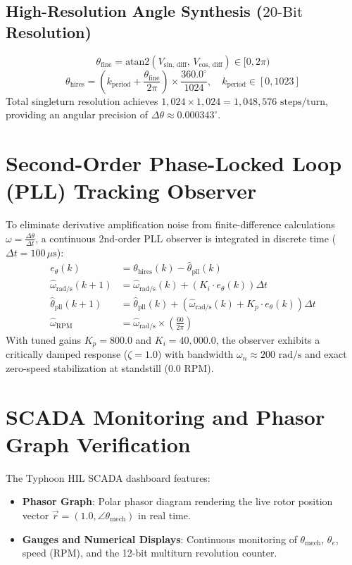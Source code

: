 \documentclass[11pt,a4paper]{article}
\begin{document}
\subsection{High-Resolution Angle Synthesis ($20\text{-Bit}$ Resolution)}
\begin{equation}
\theta_{\text{fine}} = \text{atan2}(V_{\text{sin, diff}},\, V_{\text{cos, diff}}) \in [0, 2\pi)
\end{equation}
\begin{equation}
\theta_{\text{hires}} = \left( k_{\text{period}} + \frac{\theta_{\text{fine}}}{2\pi} \right) \times \frac{360.0^\circ}{1024}, \quad k_{\text{period}} \in [0, 1023]
\end{equation}
Total singleturn resolution achieves $1,024 \times 1,024 = 1,048,576\text{ steps/turn}$, providing an angular precision of $\Delta\theta \approx 0.000343^\circ$.

\section{Second-Order Phase-Locked Loop (PLL) Tracking Observer}
To eliminate derivative amplification noise from finite-difference calculations $\omega = \frac{\Delta\theta}{\Delta t}$, a continuous 2nd-order PLL observer is integrated in discrete time ($\Delta t = 100\,\mu\text{s}$):
\begin{align}
e_{\theta}(k) &= \theta_{\text{hires}}(k) - \hat{\theta}_{\text{pll}}(k) \\
\hat{\omega}_{\text{rad/s}}(k+1) &= \hat{\omega}_{\text{rad/s}}(k) + \left( K_i \cdot e_{\theta}(k) \right) \Delta t \\
\hat{\theta}_{\text{pll}}(k+1) &= \hat{\theta}_{\text{pll}}(k) + \left( \hat{\omega}_{\text{rad/s}}(k) + K_p \cdot e_{\theta}(k) \right) \Delta t \\
\hat{\omega}_{\text{RPM}} &= \hat{\omega}_{\text{rad/s}} \times \left( \frac{60}{2\pi} \right)
\end{align}
With tuned gains $K_p = 800.0$ and $K_i = 40,000.0$, the observer exhibits a critically damped response ($\zeta = 1.0$) with bandwidth $\omega_n \approx 200\text{ rad/s}$ and exact zero-speed stabilization at standstill ($0.0\text{ RPM}$).

\section{SCADA Monitoring and Phasor Graph Verification}
The Typhoon HIL SCADA dashboard features:
\begin{itemize}
    \item \textbf{Phasor Graph}: Polar phasor diagram rendering the live rotor position vector $\vec{r} = (1.0, \angle\theta_{\text{mech}})$ in real time.
    \item \textbf{Gauges and Numerical Displays}: Continuous monitoring of $\theta_{\text{mech}}$, $\theta_e$, speed (RPM), and the 12-bit multiturn revolution counter.
\end{itemize}
\end{document}
